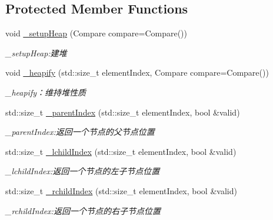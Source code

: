 \subsection*{Protected Member Functions}
\begin{DoxyCompactItemize}
\item 
void \hyperlink{class_introduction_to_algorithm_1_1_sort_algorithm_1_1_sort___heap_a9efd56574722e687d7024d484056bd81}{\+\_\+setup\+Heap} (Compare compare=Compare())
\begin{DoxyCompactList}\small\item\em \+\_\+setup\+Heap\+:建堆 \end{DoxyCompactList}\item 
void \hyperlink{class_introduction_to_algorithm_1_1_sort_algorithm_1_1_sort___heap_ad0fbc2d900bc5bcbfc1e94d431d439c1}{\+\_\+heapify} (std\+::size\+\_\+t element\+Index, Compare compare=Compare())
\begin{DoxyCompactList}\small\item\em \+\_\+heapify：维持堆性质 \end{DoxyCompactList}\item 
std\+::size\+\_\+t \hyperlink{class_introduction_to_algorithm_1_1_sort_algorithm_1_1_sort___heap_a66dd5ab1a501f00f9857602d9a32a2af}{\+\_\+parent\+Index} (std\+::size\+\_\+t element\+Index, bool \&valid)
\begin{DoxyCompactList}\small\item\em \+\_\+parent\+Index\+:返回一个节点的父节点位置 \end{DoxyCompactList}\item 
std\+::size\+\_\+t \hyperlink{class_introduction_to_algorithm_1_1_sort_algorithm_1_1_sort___heap_aaf19e3c85dbfc8e2fd53644207a5008e}{\+\_\+lchild\+Index} (std\+::size\+\_\+t element\+Index, bool \&valid)
\begin{DoxyCompactList}\small\item\em \+\_\+lchild\+Index\+:返回一个节点的左子节点位置 \end{DoxyCompactList}\item 
std\+::size\+\_\+t \hyperlink{class_introduction_to_algorithm_1_1_sort_algorithm_1_1_sort___heap_a07cb956eda45dffe0c229c5fce03fd96}{\+\_\+rchild\+Index} (std\+::size\+\_\+t element\+Index, bool \&valid)
\begin{DoxyCompactList}\small\item\em \+\_\+rchild\+Index\+:返回一个节点的右子节点位置 \end{DoxyCompactList}\end{DoxyCompactItemize}
